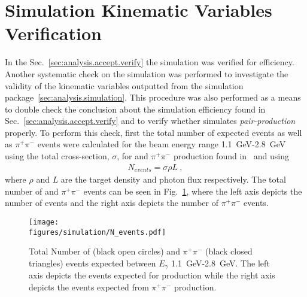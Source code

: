 \section{Simulation Kinematic Variables Verification}\label{sec:analysis.simsmear.verify}

In the Sec.~\ref{sec:analysis.accept.verify} the simulation was verified for efficiency. Another systematic check on the simulation was performed to investigate the validity of the kinematic variables outputted from the simulation package~\ref{sec:analysis.simulation}. This procedure was also performed as a means to double check the conclusion about the simulation efficiency found in Sec.~\ref{sec:analysis.accept.verify} and to verify whether  simulates \emph{pair-production} properly. To perform this check, first the total number of expected \piz events as well as $\pi^+\pi^-$ events were calculated for the beam energy range 1.1~GeV-2.8~GeV using the total cross-section, $\sigma$, for \piz and $\pi^+\pi^-$ production found in~\cite{durham} and using
\begin{align}
N_{events} = \sigma \rho L \ ,
\end{align}
where $\rho$ and $L$ are the target density and photon flux respectively. The total number of \piz and $\pi^+\pi^-$ events can be seen in Fig.~\ref{fig:simsmear.Ntot}, where the left axis depicts the number of \piz events and the right axis depicts the number of $\pi^+\pi^-$ events.
\begin{figure}[h!]\begin{center}
\texttt{[image: \\figures/simulation/N\_events.pdf]}
\caption[Total Number of \piz and $\pi^+\pi^-$ Events Expected Between $E_{\gamma}$ 1.1~GeV-2.8~GeV ]{\label{fig:simsmear.Ntot}Total Number of \piz (black open circles) and $\pi^+\pi^-$ (black closed triangles) events expected between $E_{\gamma}$ 1.1~GeV-2.8~GeV. The left axis depicts the events expected for \piz production while the right axis depicts the events expected from $\pi^+\pi^-$ production. }
\end{center}\end{figure} 

